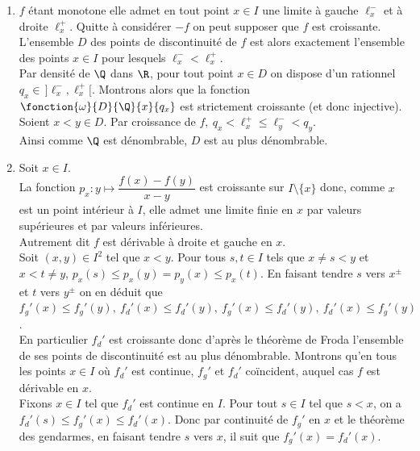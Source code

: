 \documentclass[8pt]{book}
\begin{document}
	\begin{enumerate}[leftmargin=*]
		\item $f$ étant monotone elle admet en tout point $x\in I$ une limite à gauche $\ell_x^-$ et à droite $\ell_x^+$. Quitte à considérer $-f$ on peut supposer que $f$ est croissante.\\
		L'ensemble $D$ des points de discontinuité de $f$ est alors exactement l'ensemble des points $x\in I$ pour lesquels $\ell_x^-<\ell_x^+$.\\
		Par densité de $\Q$ dans $\R$, pour tout point $x\in D$ on dispose d'un rationnel $q_x\in\, ]\ell_x^-,\ell_x^+[$. Montrons alors que la fonction $\fonction{\omega}{D}{\Q}{x}{q_x}$ est strictement croissante (et donc injective).\\
		Soient $x<y\in D$. Par croissance de $f,\ q_x<\ell_x^+\leq \ell_y^-<q_y$.\\
		Ainsi comme $\Q$ est dénombrable, $D$ est au plus dénombrable.
		\item Soit $x\in I$.\\
		La fonction $p_x:y\mapsto \dfrac{f(x)-f(y)}{x-y}$ est croissante sur $I\setminus\{x\}$ donc, comme $x$ est un point intérieur à $I$, elle admet une limite finie en $x$ par valeurs supérieures et par valeurs inférieures.\\
		Autrement dit $f$ est dérivable à droite et gauche en $x$.\\
		Soit $(x,y)\in I^2$ tel que $x<y$. Pour tous $s,t\in I$ tels que $x\ne s<y$ et $x<t\ne y$, $p_x(s)\leq p_x(y)=p_y(x)\leq p_x(t)$. En faisant tendre $s$ vers $x^\pm$ et $t$ vers $y^\pm$ on en déduit que $f_g'(x)\leq f_g'(y),\ f_d'(x)\leq f_d'(y),\ f_g'(x)\leq f_d'(y),\ f_d'(x)\leq f_g'(y)$.\\
		En particulier $f_d'$ est croissante donc d'après le théorème de Froda l'ensemble de ses points de discontinuité est au plus dénombrable. Montrons qu'en tous les points $x\in I$ où $f_d'$ est continue, $f_g'$ et $f_d'$ coïncident, auquel cas $f$ est dérivable en $x$.\\
		Fixons $x\in I$ tel que $f_d'$ est continue en $I$. Pour tout $s\in I$ tel que $s<x$, on a $f_d'(s)\leq f_g'(x)\leq f_d'(x)$. Donc par continuité de $f_g'$ en $x$ et le théorème des gendarmes, en faisant tendre $s$ vers $x$, il suit que $f_g'(x)=f_d'(x)$.
	\end{enumerate}
	
\end{document}
